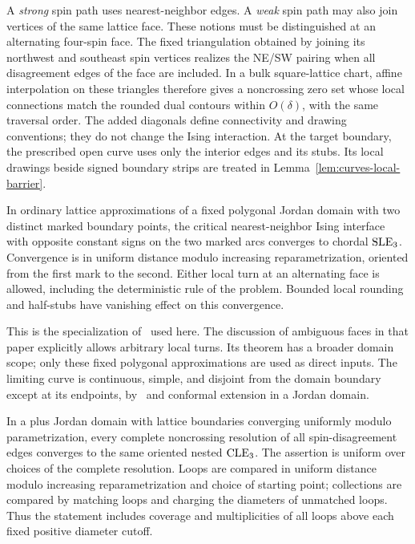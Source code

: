 A \emph{strong} spin path uses nearest-neighbor edges. A \emph{weak}
spin path may also join vertices of the same lattice face. These
notions must be distinguished at an alternating four-spin face. The
fixed triangulation obtained by joining its northwest and southeast
spin vertices realizes the NE/SW pairing when all disagreement edges
of the face are included. In a bulk square-lattice chart, affine
interpolation on these triangles therefore gives a noncrossing zero
set whose local connections match the rounded dual contours within
\(O(\delta)\), with the same traversal order. The added diagonals
define connectivity and drawing conventions; they do not change the
Ising interaction. At the target boundary, the prescribed open curve
uses only the interior edges and its stubs. Its local drawings beside
signed boundary strips are treated in
Lemma~\ref{lem:curves-local-barrier}.

\begin{theorem}
\label{thm:pure-sle}
In ordinary lattice approximations of a fixed polygonal Jordan domain
with two distinct marked boundary points, the critical nearest-neighbor
Ising interface with opposite constant signs on the two marked arcs
converges to chordal \(\operatorname{SLE}_3\). Convergence is in uniform distance
modulo increasing reparametrization, oriented from the first mark to
the second. Either local turn at an alternating face is allowed,
including the deterministic rule of the problem. Bounded local
rounding and half-stubs have vanishing effect on this convergence.
\end{theorem}

This is the specialization of~\cite[Theorem~1 and Equation~(1)]{CDHKS2014}
used here. The discussion of ambiguous faces in that paper explicitly
allows arbitrary local turns. Its theorem has a broader domain scope;
only these fixed polygonal approximations are used as direct inputs.
The limiting curve is continuous, simple, and disjoint from the domain
boundary except at its endpoints, by~\cite[Theorems~5.1, 6.1,
and~7.1]{RS2005} and conformal extension in a Jordan domain.

\begin{theorem}
\label{thm:pure-cle}
In a plus Jordan domain with lattice boundaries converging uniformly
modulo parametrization, every complete noncrossing resolution of all
spin-disagreement edges converges to the same oriented nested
\(\operatorname{CLE}_3\). The assertion is uniform over choices of the complete
resolution. Loops are compared in uniform distance modulo increasing
reparametrization and choice of starting point; collections are
compared by matching loops and charging the diameters of unmatched
loops. Thus the statement includes coverage and multiplicities of all
loops above each fixed positive diameter cutoff.
\end{theorem}


